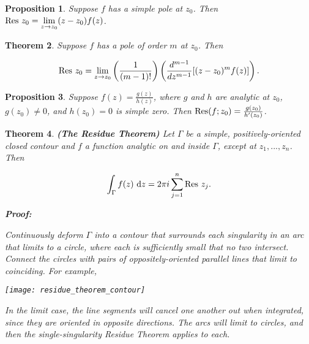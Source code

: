 \documentclass{article}
\theoremstyle{colontheorem}
\newtheorem{theorem}{Theorem}[section]
\newtheorem{proposition}[theorem]{Proposition}
\newcommand{\Res}{\textnormal{Res}}
\newenvironment{Theorem}
{
	\begin{mdframed}[backgroundcolor=TheoremOrange!10]
	\begin{theorem}
}
{
	\end{theorem}
	\end{mdframed}
	
	\vspace{.15in}
}
\newenvironment{Proposition}
{
	\begin{mdframed}[backgroundcolor=TheoremOrange!10]
	\begin{proposition}
}
{
	\end{proposition}
	\end{mdframed}
	
	\vspace{.15in}
}
\newenvironment{Proof}
{
	\begin{mdframed}[backgroundcolor=ProofPurple!10]
	\textbf{Proof:}%
}
{
	\end{mdframed}
	
	\vspace{.085in}
}
\begin{document}
\begin{Proposition}
	
	Suppose $f$ has a simple pole at $z_0$. Then $\Res\ z_0 = \lim\limits_{z \to z_0} (z - z_0) f(z)$.
	
\end{Proposition}



\begin{Theorem}
	
	Suppose $f$ has a pole of order $m$ at $z_0$. Then
	
	$$
		\Res\ z_0 = \lim\limits_{z \to z_0} \left( \frac{1}{(m - 1)!} \right) \left( \frac{d^{m - 1}}{dz^{m - 1}} [ (z - z_0)^m f(z) ] \right).
	$$
	
\end{Theorem}



\begin{Proposition}
	
	Suppose $f(z) = \frac{g(z)}{h(z)}$, where $g$ and $h$ are analytic at $z_0$, $g(z_0) \neq 0$, and $h(z_0) = 0$ is simple zero. Then $\Res(f; z_0) = \frac{g(z_0)}{h'(z_0)}$.
	
\end{Proposition}



\begin{Theorem}
	
	\textbf{(The Residue Theorem)} Let $\Gamma$ be a simple, positively-oriented closed contour and $f$ a function analytic on and inside $\Gamma$, except at $z_1, ..., z_n$. Then
	
	$$
		\int_\Gamma f(z)\ \textnormal{d}z = 2 \pi i \displaystyle\sum\limits_{j = 1}^n \Res\ z_j.
	$$
	
	\begin{Proof}
		Continuously deform $\Gamma$ into a contour that surrounds each singularity in an arc that limits to a circle, where each is sufficiently small that no two intersect. Connect the circles with pairs of oppositely-oriented parallel lines that limit to coinciding. For example,
		
		\begin{center}
			
			\texttt{[image: residue\_theorem\_contour]}
			
		\end{center}
		
		In the limit case, the line segments will cancel one another out when integrated, since they are oriented in opposite directions. The arcs will limit to circles, and then the single-singularity Residue Theorem applies to each.
		
	\end{Proof}
	
\end{Theorem}
\end{document}

